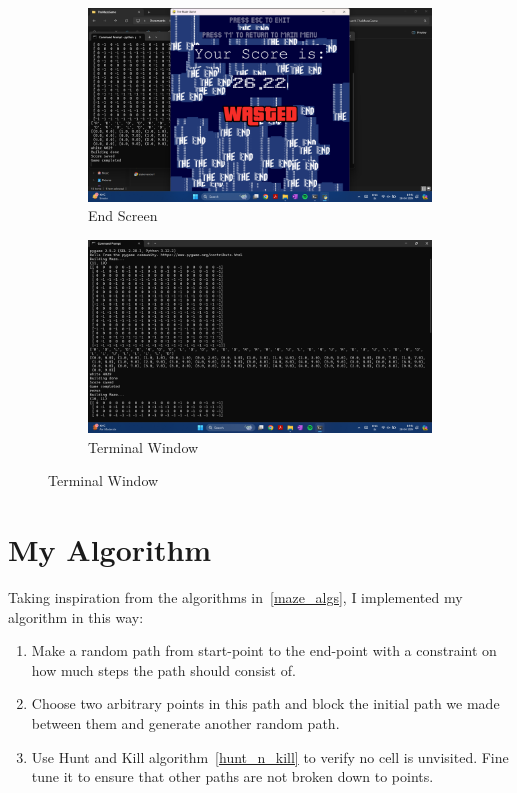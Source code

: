 \documentclass{article}
\begin{document}
\begin{figure}[h]
    \begin{subfigure}[b]{0.5\textwidth}
        \centering
        \includegraphics[width=\textwidth]{screenshots/Screenshot (183).png}
        \caption[(a)]{End Screen}
        \label{fig:final3}
    \end{subfigure}
    \begin{subfigure}[b]{0.5\textwidth}
        \centering
        \includegraphics[width=\textwidth]{screenshots/Screenshot (184).png}
        \caption[(a)]{Terminal Window}
        \label{fig:final4}
    \end{subfigure}
\end{figure}

\section{My Algorithm}
\label{my_alg}
Taking inspiration from the algorithms in~\ref{maze_algs}, I implemented my algorithm in this way:

\begin{enumerate}
    \item Make a random path from start-point to the end-point with a constraint on how much steps the path should consist of.
    \item Choose two arbitrary points in this path and block the initial path we made between them and generate another random path.
    \item Use Hunt and Kill algorithm~\ref{hunt_n_kill} to verify no cell is unvisited. Fine tune it to ensure that other paths are not broken down to points.
\end{enumerate}
\end{document}
